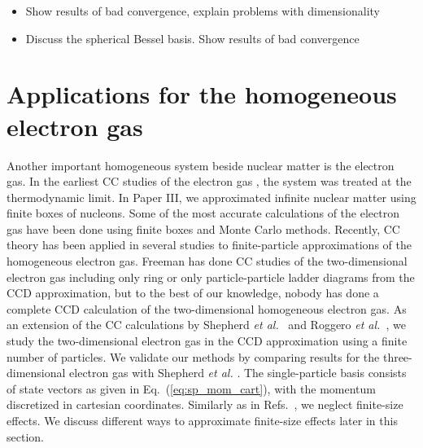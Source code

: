 \documentclass[a4paper,12pt]{report}
\begin{document}
 




\vspace{4cm}
\begin{itemize}
\item Show results of bad convergence, explain problems with dimensionality
\item Discuss the spherical Bessel basis. Show results of bad convergence
\end{itemize}


\section{Applications for the homogeneous electron gas} \label{sec:ccheg}

Another important homogeneous system beside nuclear matter 
is the electron gas. In the earliest CC studies of the 
electron gas \cite{singal1973,freeman1977,bishop1978,
freeman1978,bishop1982,freeman1983}, the system was treated 
at the thermodynamic limit. In Paper III, we approximated 
infinite nuclear matter using finite boxes of nucleons. 
Some of the most accurate calculations of the electron gas
\cite{ceperley1980,tanatar_ceperley_1989,lopezrios2006,
shepherd_2012a} have been done using finite boxes and Monte
Carlo methods. Recently, CC theory has been applied in 
several studies \cite{shepherd_2012b,shepherd2013a,
shepherd2013b,shepherd2013c,roggero2013} to finite-particle 
approximations of the homogeneous electron gas. 
 Freeman has done CC studies of the two-dimensional 
electron gas including only ring \cite{freeman1978} or 
only particle-particle ladder \cite{freeman1983} diagrams 
from the CCD approximation, but to the best of our knowledge, 
nobody has done a complete CCD calculation of the 
two-dimensional homogeneous electron gas. 
As an extension of the CC calculations by Shepherd 
\emph{et al.}~\cite{shepherd_2012b,
shepherd2013a,shepherd2013b,shepherd2013c}
and Roggero \emph{et al.}~\cite{roggero2013}, we study
the two-dimensional electron gas in the CCD approximation
using a finite number of particles.
We validate our methods by comparing results 
for the three-dimensional electron gas with Shepherd 
\emph{et al.} \cite{shepherd_2012b,shepherd_2012c}.
The single-particle basis consists of 
state vectors as given in Eq.~(\ref{eq:sp_mom_cart}), with the 
momentum discretized in cartesian coordinates. 
Similarly as in Refs.~\cite{shepherd_2012b,shepherd2013a,
shepherd2013b,shepherd2013c,roggero2013}, we neglect 
finite-size effects. We discuss different ways to approximate
finite-size effects later in this section.
\end{document}
